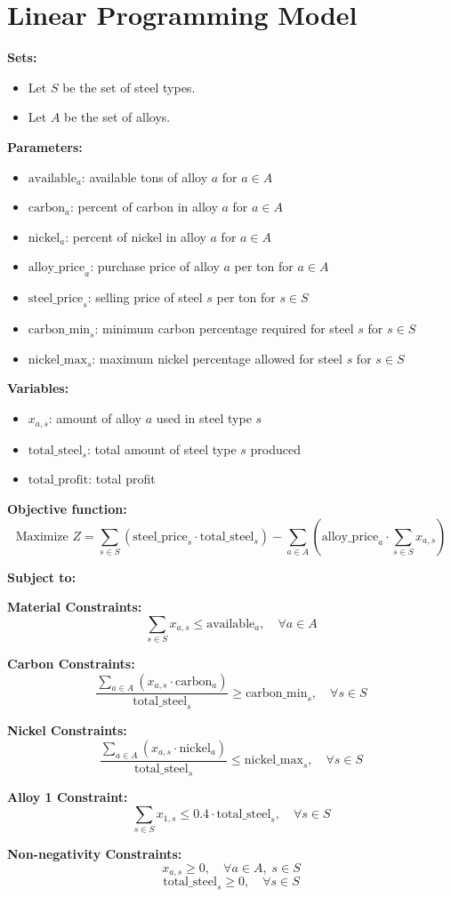 \documentclass{article}
\begin{document}
\section*{Linear Programming Model}

\textbf{Sets:}
\begin{itemize}
    \item Let \( S \) be the set of steel types.
    \item Let \( A \) be the set of alloys.
\end{itemize}

\textbf{Parameters:}
\begin{itemize}
    \item \( \text{available}_{a} \): available tons of alloy \( a \) for \( a \in A \)
    \item \( \text{carbon}_{a} \): percent of carbon in alloy \( a \) for \( a \in A \)
    \item \( \text{nickel}_{a} \): percent of nickel in alloy \( a \) for \( a \in A \)
    \item \( \text{alloy\_price}_{a} \): purchase price of alloy \( a \) per ton for \( a \in A \)
    \item \( \text{steel\_price}_{s} \): selling price of steel \( s \) per ton for \( s \in S \)
    \item \( \text{carbon\_min}_{s} \): minimum carbon percentage required for steel \( s \) for \( s \in S \)
    \item \( \text{nickel\_max}_{s} \): maximum nickel percentage allowed for steel \( s \) for \( s \in S \)
\end{itemize}

\textbf{Variables:}
\begin{itemize}
    \item \( x_{a,s} \): amount of alloy \( a \) used in steel type \( s \) 
    \item \( \text{total\_steel}_{s} \): total amount of steel type \( s \) produced
    \item \( \text{total\_profit} \): total profit
\end{itemize}

\textbf{Objective function:}
\[
\text{Maximize } Z = \sum_{s \in S} (\text{steel\_price}_{s} \cdot \text{total\_steel}_{s}) - \sum_{a \in A} (\text{alloy\_price}_{a} \cdot \sum_{s \in S} x_{a,s})
\]

\textbf{Subject to:}

\textbf{Material Constraints:}
\[
\sum_{s \in S} x_{a,s} \leq \text{available}_{a}, \quad \forall a \in A
\]

\textbf{Carbon Constraints:}
\[
\frac{\sum_{a \in A} (x_{a,s} \cdot \text{carbon}_{a})}{\text{total\_steel}_{s}} \geq \text{carbon\_min}_{s}, \quad \forall s \in S
\]

\textbf{Nickel Constraints:}
\[
\frac{\sum_{a \in A} (x_{a,s} \cdot \text{nickel}_{a})}{\text{total\_steel}_{s}} \leq \text{nickel\_max}_{s}, \quad \forall s \in S
\]

\textbf{Alloy 1 Constraint:}
\[
\sum_{s \in S} x_{1,s} \leq 0.4 \cdot \text{total\_steel}_{s}, \quad \forall s \in S
\]

\textbf{Non-negativity Constraints:}
\[
x_{a,s} \geq 0, \quad \forall a \in A, \; s \in S
\]
\[
\text{total\_steel}_{s} \geq 0, \quad \forall s \in S
\]
\end{document}
